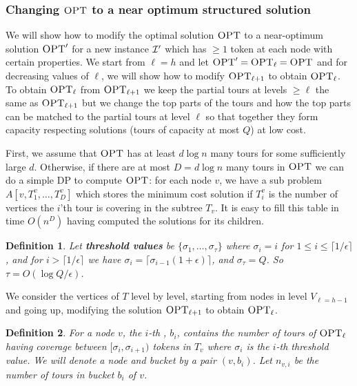 \documentclass[twoside,leqno]{article}
\newtheorem{definition}{Definition}
\newcommand{\calI}{{\cal I}}
\newcommand{\OPT}{\mbox{\sc OPT}}
\newcommand{\eps}{\epsilon}
\begin{document}
\subsubsection{Changing $\OPT$ to a near optimum structured solution}
We will show how to modify the optimal solution $\OPT$ to a near-optimum solution $\OPT'$ for a new instance $\calI'$
which has $\geq 1$ token at each node with certain properties. 
We start from $\ell=h$ and let $\OPT'=\OPT_\ell=\OPT$ and for decreasing values of $\ell$, we will show how
to modify $\OPT_{\ell+1}$ to
obtain $\OPT_{\ell}$. To obtain $\OPT_{\ell}$ from $\OPT_{\ell+1}$ we keep the partial tours at levels $\geq \ell$ the same as
$\OPT_{\ell+1}$ but we change the top parts of the tours and how the top parts can be matched to the partial tours at 
level $\ell$ so that together they form capacity respecting solutions (tours of capacity at most $Q$) at low cost.

First, we assume that $\OPT$ has at least $d\log n$ many tours for some sufficiently large $d$. Otherwise,
if there are at most $D=d\log n$ many tours in $\OPT$ we can do a simple DP to compute $\OPT$:
for each node $v$, we have a sub problem $A[v,T^v_1,\ldots,T^v_D]$ which stores the minimum cost solution
if $T^v_i$ is the number of vertices the $i$'th tour is covering in the subtree $T_v$. It is easy to fill this table in
time $O(n^D)$ having computed the solutions for its children.

\begin{definition}
Let \textbf{threshold values} be $\{\sigma_1, \ldots, \sigma_\tau \}$ where $\sigma_i=i$ for $1\leq i\leq \lceil 1/\epsilon\rceil$,
 and for $i>\lceil 1/\epsilon\rceil$ we have $\sigma_i = \lceil\sigma_{i-1}(1 + \eps)\rceil$, and $\sigma_\tau = Q$. 
So $\tau=O(\log Q/\epsilon)$.
\end{definition}

We consider the vertices of $T$ level by level, starting from nodes in level $V_{\ell=h-1}$
and going up, modifying the solution $\OPT_{\ell+1}$ to obtain $\OPT_{\ell}$. 

\begin{definition}
For a node $v$, the $i$-th , $b_i$, contains the number of tours of $\OPT_\ell$ having coverage between $[\sigma_i, \sigma_{i+1})$ tokens in $T_v$ where $\sigma_i$ is the $i$-th threshold value. We will denote a node and bucket by a pair $(v,b_i)$. Let $n_{v,i}$ be the number of tours in bucket $b_i$ of $v$. 
\end{definition}
\end{document}
